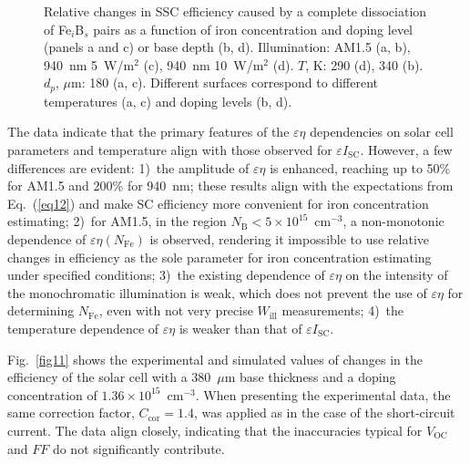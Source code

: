\documentclass[a4paper,fleqn]{cas-sc}
\begin{document}
\begin{figure}
	  \caption{Relative changes in SSC efficiency caused by a complete
       dissociation of Fe$_i$B$_s$ pairs as a function of
       iron concentration and
       doping level (panels a and c) or base depth (b, d).
       Illumination: AM1.5 (a, b), 940~nm 5~W/m$^{2}$ (c),  940~nm 10~W/m$^{2}$ (d).
       $T$, K: 290 (d), 340 (b).
       $d_p$, $\mu$m: 180 (a, c).
       Different surfaces correspond to different temperatures (a, c) and doping levels (b, d).
}\label{fig10}
\end{figure}

The data indicate that the primary features of the $\varepsilon \eta$ dependencies
on solar cell parameters and temperature align with those observed for $\varepsilon I_\mathrm{SC}$.
However, a few differences are evident:
1)~the amplitude of  $\varepsilon \eta$ is enhanced,
reaching up to 50\% for AM1.5 and 200\% for 940~nm;
these results align with the expectations from Eq.~(\ref{eq12})
and make SC efficiency more convenient for iron concentration estimating;
2)~for AM1.5, in the region $N_\mathrm{B}<5\times10^{15}$~cm$^{-3}$,
a non-monotonic dependence of $\varepsilon \eta$$\left(N_\mathrm{Fe}\right)$ is observed,
rendering it impossible to use relative changes in efficiency as the sole parameter for iron concentration estimating under specified conditions;
3)~the existing dependence of $\varepsilon \eta$ on the intensity of the monochromatic illumination is weak,
which does not prevent the use of $\varepsilon \eta$ for determining $N_\mathrm{Fe}$, even with not very precise $W_\mathrm{ill}$ measurements;
4)~the temperature dependence of $\varepsilon \eta$ is weaker than that of $\varepsilon I_\mathrm{SC}$.


Fig.~\ref{fig11} shows the experimental and simulated values of changes in the efficiency of the solar cell
with a 380~$\mu$m base thickness and a doping concentration of $1.36\times10^{15}$~cm$^{-3}$.
When presenting the experimental data, the same correction factor, $C_\mathrm{cor} = 1.4$, was applied as in the case of the short-circuit current.
The data align closely, indicating that the inaccuracies typical for $V_\mathrm{OC}$ and $F\!F$  do not significantly contribute.
\end{document}
